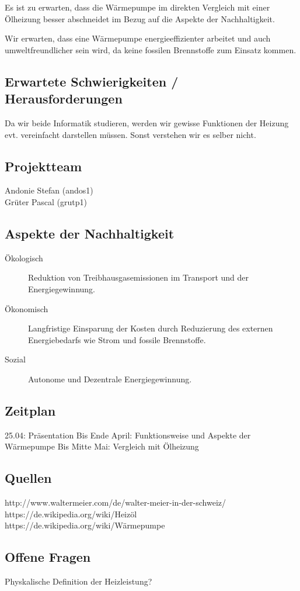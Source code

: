\documentclass[10pt,paper=a4,final]{scrartcl}
\begin{document}
  Es ist zu erwarten, dass die Wärmepumpe im direkten Vergleich mit einer
  Ölheizung besser abschneidet im Bezug auf die Aspekte der Nachhaltigkeit.
  
  Wir erwarten, dass eine Wärmepumpe energieeffizienter arbeitet und auch
  umweltfreundlicher sein wird, da keine fossilen Brennstoffe zum Einsatz kommen.

\subsection*{Erwartete Schwierigkeiten / Herausforderungen}

Da wir beide Informatik studieren, werden wir gewisse Funktionen der Heizung evt. vereinfacht darstellen müssen. Sonst verstehen wir es selber nicht.

\subsection*{Projektteam}

  \begin{description}
    \item[Andonie Stefan (andos1)]
    \item[Grüter Pascal (grutp1)]
  \end{description}

\subsection*{Aspekte der Nachhaltigkeit}

  \begin{description}
    \item[Ökologisch] Reduktion von Treibhausgasemissionen im Transport und
    der Energiegewinnung.
    \item[Ökonomisch] Langfristige Einsparung der Kosten durch Reduzierung des
    externen Energiebedarfs wie Strom und fossile Brennstoffe.
    \item[Sozial] Autonome und Dezentrale Energiegewinnung.
  \end{description}

\subsection*{Zeitplan}

25.04: Präsentation
Bis Ende April: Funktionsweise und Aspekte der Wärmepumpe
Bis Mitte Mai: Vergleich mit Ölheizung

\subsection*{Quellen}

http://www.waltermeier.com/de/walter-meier-in-der-schweiz/ \\
https://de.wikipedia.org/wiki/Heizöl \\
https://de.wikipedia.org/wiki/Wärmepumpe \\

\subsection*{Offene Fragen}

Physkalische Definition der Heizleistung?
\end{document}
